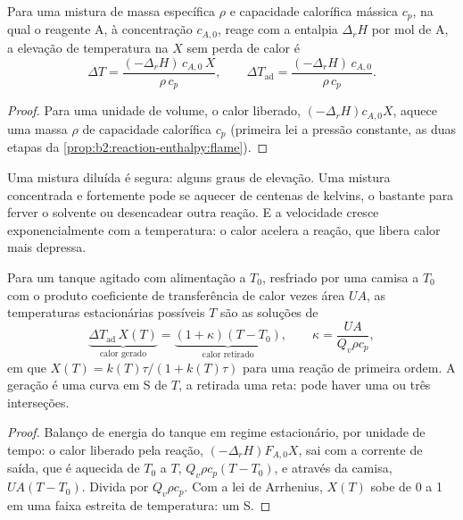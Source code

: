 \begin{proposition}\label{prop:b2:continuous-reactors:adiabatic}
Para uma mistura de massa específica $\rho$ e capacidade calorífica mássica
$c_p$, na qual o reagente A, à concentração $c_{A,0}$, reage com a entalpia
$\Delta_r H$ por mol de A, a elevação de temperatura na  $X$ sem
perda de calor é
\[
  \Delta T = \frac{(-\Delta_r H)\,c_{A,0}\,X}{\rho\,c_p}, \qquad
  \Delta T_{\text{ad}} = \frac{(-\Delta_r H)\,c_{A,0}}{\rho\,c_p} .
\]
\end{proposition}

\begin{proof}
Para uma unidade de volume, o calor liberado, $(-\Delta_r H)c_{A,0}X$, aquece
uma massa $\rho$ de capacidade calorífica $c_p$ (primeira lei a pressão
constante, as duas etapas da \cref{prop:b2:reaction-enthalpy:flame}).
\end{proof}

Uma mistura diluída é segura: alguns graus de elevação. Uma mistura
concentrada e fortemente  pode se aquecer de centenas de kelvins,
o bastante para ferver o solvente ou desencadear outra reação. E a
velocidade cresce exponencialmente com a temperatura: o calor acelera a
reação, que libera calor mais depressa.

\begin{proposition}\label{prop:b2:continuous-reactors:steady-states}
Para um tanque agitado com alimentação a $T_0$, resfriado por uma camisa a
$T_0$ com o produto coeficiente de transferência de calor vezes área $UA$, as
temperaturas estacionárias possíveis $T$ são as soluções de
\[
  \underbrace{\Delta T_{\text{ad}}\,X(T)}_{\text{calor gerado}} =
  \underbrace{(1 + \kappa)(T - T_0)}_{\text{calor retirado}}, \qquad
  \kappa = \frac{UA}{Q_v\rho c_p},
\]
em que $X(T) = k(T)\tau/(1 + k(T)\tau)$ para uma reação de primeira ordem. A
geração é uma curva em S de $T$, a retirada uma reta: pode haver uma ou três
interseções.
\end{proposition}

\begin{proof}
Balanço de energia do tanque em regime estacionário, por unidade de tempo: o
calor liberado pela reação, $(-\Delta_r H)F_{A,0}X$, sai com a corrente de
saída, que é aquecida de $T_0$ a $T$, $Q_v\rho c_p(T - T_0)$, e através da
camisa, $UA(T - T_0)$. Divida por $Q_v\rho c_p$. Com a lei de Arrhenius,
$X(T)$ sobe de 0 a 1 em uma faixa estreita de temperatura: um S.
\end{proof}

